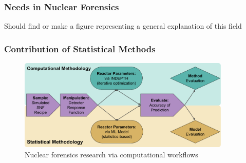 \begin{frame}
  \frametitle{Needs in Nuclear Forensics}
  Should find or make a figure representing a general explanation of this field
\end{frame}

\begin{frame}
  \frametitle{Contribution of Statistical Methods}
  \begin{figure}[h!]
    \centering
    \includegraphics[width=0.9\textwidth]{CompStatForensicsWorkflow.png}
    \caption{Nuclear forensics research via computational workflows}
  \end{figure}
\end{frame}
